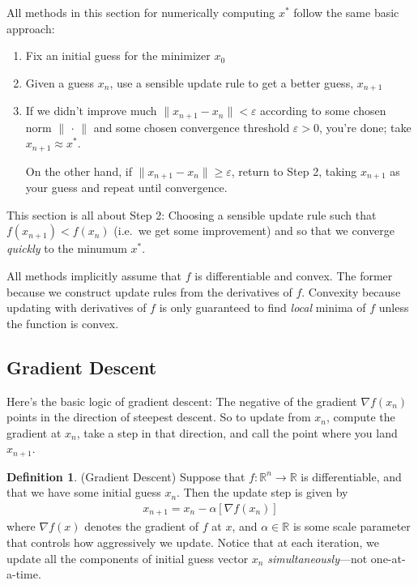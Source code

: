 \documentclass[12pt]{book}
\numberwithin{equation}{section} %
\theoremstyle{plain}
\theoremstyle{definition}
\newtheorem{defn}[thm]{Definition}
\theoremstyle{remark}
\newcommand{\ra}{\rightarrow}
\newcommand{\R}{\mathbb{R}}
\newcommand{\Rn}{\mathbb{R}^n}
\begin{document}
All methods in this section for numerically computing $x^*$ follow the
same basic approach:
\begin{enumerate}
  \item Fix an initial guess for the minimizer $x_0$
  \item Given a guess $x_n$, use a sensible update rule to get a better
    guess, $x_{n+1}$
  \item If we didn't improve much $\lVert x_{n+1}-x_n\lVert<\varepsilon$
    according to some chosen norm $\lVert\,\cdot\,\rVert$ and some
    chosen convergence threshold $\varepsilon>0$, you're done; take
    $x_{n+1}\approx x^*$.

    On the other hand, if $\lVert x_{n+1}-x_n\lVert\geq \varepsilon$,
    return to Step 2, taking $x_{n+1}$ as your guess and repeat
    until convergence.
\end{enumerate}
This section is all about Step 2: Choosing a sensible update rule
such that $f(x_{n+1}) < f(x_n)$ (i.e.\ we get some improvement) and so
that we converge \emph{quickly} to the minumum $x^*$.

All methods implicitly assume that $f$ is differentiable and convex. The
former because we construct update rules from the derivatives of $f$.
Convexity because updating with derivatives of $f$ is only guaranteed to
find \emph{local} minima of $f$ unless the function is convex.


\clearpage
\subsection{Gradient Descent}

Here's the basic logic of gradient descent: The negative of the gradient
$\nabla f(x_n)$ points in the direction of steepest descent. So to
update from $x_n$, compute the gradient at $x_n$, take a step in that
direction, and call the point where you land $x_{n+1}$.

\begin{defn}(Gradient Descent)
Suppose that $f:\Rn\ra\R$ is differentiable, and that we have some
initial guess $x_n$. Then the update step is given by
\begin{align*}
  \label{eq:multigradesc}
  x_{n+1} = x_n - \alpha [\nabla f(x_n)]
\end{align*}
where $\nabla f(x)$ denotes the gradient of $f$ at $x$, and
$\alpha\in\R$ is some scale parameter that controls how aggressively we
update.
Notice that at each iteration, we update all the components of initial
guess vector $x_n$ \emph{simultaneously}---not one-at-a-time.
\end{defn}
\end{document}
